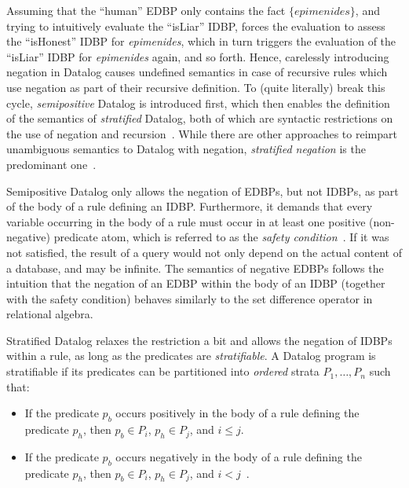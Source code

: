 Assuming that the ``human'' \ac{EDBP} only contains the fact
\(\{ \mathit{epimenides} \}\)\footnotemark{}, and trying to intuitively evaluate the
``isLiar'' \ac{IDBP}, forces the evaluation to assess the ``isHonest'' \ac{IDBP}
for \textit{epimenides}, which in turn triggers the evaluation of the
``isLiar'' \ac{IDBP} for \textit{epimenides} again, and so forth.
Hence, carelessly introducing negation in Datalog causes undefined semantics
in case of recursive rules which use negation as part of their recursive definition.
To (quite literally) break this cycle, \emph{semipositive} Datalog is introduced
first, which then enables the definition of the semantics of \emph{stratified}
Datalog, both of which are syntactic restrictions on the use of negation and
recursion~\cite{green2013datalog}.
While there are other approaches to reimpart unambiguous semantics to
Datalog with negation, \emph{stratified negation} is the predominant
one~\cite{green2013datalog}.


Semipositive Datalog only allows the negation of \acp{EDBP}, but not \acp{IDBP},
as part of the body of a rule defining an \ac{IDBP}.
Furthermore, it demands that every variable occurring in the body of a rule must
occur in at least one positive (non-negative) predicate atom,
which is referred to as the \emph{safety condition}~\cite{green2013datalog}.
If it was not satisfied, the result of a query would not only depend on the
actual content of a database, and may be infinite.
The semantics of negative \acp{EDBP} follows the intuition that
the negation of an \ac{EDBP} within the body of an \ac{IDBP} (together with
the safety condition) behaves similarly to the set difference operator
in relational algebra.

Stratified Datalog relaxes the restriction a bit and allows the
negation of \acp{IDBP} within a rule, as long as the predicates
are \emph{stratifiable}.
A Datalog program is stratifiable if its predicates can be partitioned into
\emph{ordered} strata \(P_1, \ldots, P_n\) such that:

\begin{itemize}
    \item If the predicate \(p_b\) occurs positively in the body of a rule
          defining the predicate \(p_h\), then \(p_b \in P_i\), \(p_h \in P_j\),
          and \(i \leq j\).
    \item If the predicate \(p_b\) occurs negatively in the body of a rule
          defining the predicate \(p_h\), then \(p_b \in P_i\),
          \(p_h \in P_j\), and \(i < j\)~\cite{green2013datalog}.
\end{itemize}

